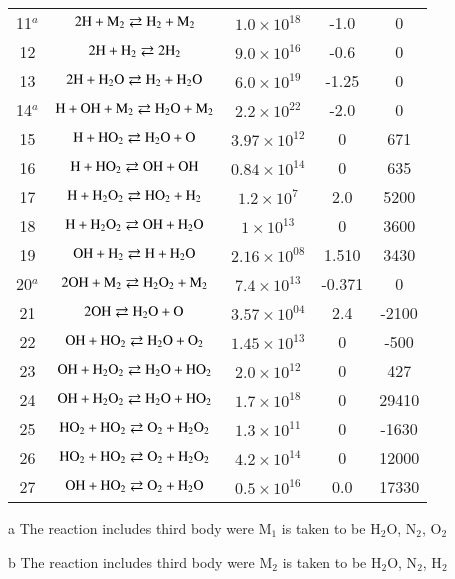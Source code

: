 \documentclass{warpdoc}
\begin{document}
\begin{table}[t]
\begin{center}
\begin{threeparttable}
\begin{tabular}{ccccc}
    11$^a$ & $\rm 2H + M_2 \rightleftarrows  H_2 + M_2$  & $ 1.0 \times 10^{18} $& -1.0 & 0 \\
    12 & $\rm 2H + H_2 \rightleftarrows  2H_2 $  & $ 9.0 \times 10^{16} $& -0.6 & 0 \\
    13 & $\rm 2H + H_2O \rightleftarrows  H_2 + H_2O$  & $ 6.0 \times 10^{19} $& -1.25 & 0 \\
    14$^a$ & $\rm H + OH + M_2 \rightleftarrows  H_2O + M_2$  & $ 2.2 \times 10^{22} $& -2.0 & 0 \\
    15 & $\rm H + HO_2 \rightleftarrows  H_2O + O$  & $ 3.97 \times 10^{12} $& 0 & 671 \\
    16 & $\rm H + HO_2 \rightleftarrows  OH + OH$  & $ 0.84 \times 10^{14} $& 0 & 635 \\
    17 & $\rm H + H_2O_2 \rightleftarrows  HO_2 + H_2$  & $ 1.2 \times 10^{7} $& 2.0 & 5200 \\
    18 & $\rm H + H_2O_2 \rightleftarrows  OH + H_2O$  & $ 1 \times 10^{13} $& 0 & 3600 \\
    19 & $\rm OH + H_2 \rightleftarrows  H + H_2O$  & $ 2.16 \times 10^{08} $& 1.510 & 3430 \\
    20$^a$ & $\rm 2OH + M_2 \rightleftarrows  H_2O_2 + M_2$  & $ 7.4 \times 10^{13} $& -0.371 & 0 \\
    21 & $\rm 2OH \rightleftarrows  H_2O + O$  & $ 3.57 \times 10^{04} $& 2.4 & -2100 \\
    22 & $\rm OH + HO_2 \rightleftarrows  H_2O + O_2$  & $ 1.45 \times 10^{13} $& 0 & -500 \\
    23 & $\rm OH + H_2O_2 \rightleftarrows  H_2O + HO_2$  & $ 2.0 \times 10^{12} $& 0 & 427 \\
    24 & $\rm OH + H_2O_2 \rightleftarrows  H_2O + HO_2$  & $ 1.7 \times 10^{18} $& 0 & 29410  \\
    25 & $\rm HO_2 + HO_2 \rightleftarrows  O_2 + H_2O_2$  & $ 1.3 \times 10^{11} $& 0 & -1630  \\
    26 & $\rm HO_2 + HO_2 \rightleftarrows  O_2 + H_2O_2$  & $ 4.2 \times 10^{14} $& 0 & 12000  \\
    27 & $\rm OH + HO_2 \rightleftarrows  O_2 + H_2O$  & $ 0.5 \times 10^{16} $& 0.0 & 17330  \\
\bottomrule
\end{tabular}
\label{tab:smith-reaction}
\begin{tablenotes}
\item[{a}] The reaction includes third body were M$_1$ is taken to be H$_2$O, N$_2$, O$_2$
\item[{b}] The reaction includes third body were M$_2$ is taken to be H$_2$O, N$_2$, H$_2$\\
\end{tablenotes}
\end{threeparttable}
\end{center}
\end{table}
%














\end{document}

